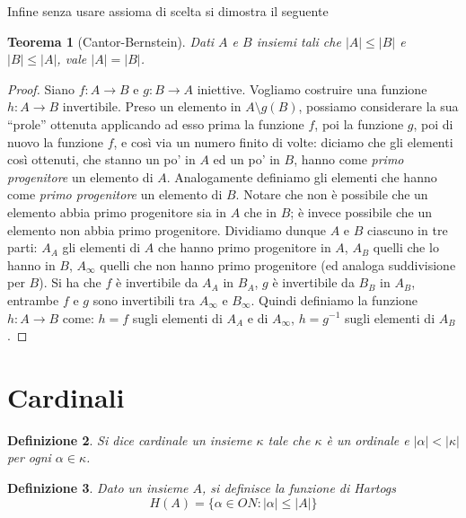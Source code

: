 \documentclass[a4paper,10pt,oneside]{article}
\newcommand{\myname}[1]{\emph{#1}}
\newcommand{\abs}[1]{\left|#1\right|}
\theoremstyle{plain}
\newtheorem{mytheorem}{Teorema}[section]
\newtheorem{mydef}[mytheorem]{Definizione}
\theoremstyle{definition}
\theoremstyle{remark}
\begin{document}
Infine senza usare assioma di scelta si dimostra il seguente

\begin{mytheorem}[Cantor-Bernstein]
 Dati $A$ e $B$ insiemi tali che $\abs A\le\abs B$ e $\abs B\le\abs A$, vale $\abs A=\abs B$.
\end{mytheorem}
\begin{proof}
 Siano $f:A\rightarrow B$ e $g:B\rightarrow A$ iniettive.
 Vogliamo costruire una funzione $h:A\rightarrow B$ invertibile.
 Preso un elemento in $A\setminus g(B)$, possiamo considerare la sua ``prole'' ottenuta applicando ad esso prima la funzione $f$, poi la funzione $g$, poi di nuovo la funzione $f$, e così via un numero finito di volte: diciamo che gli elementi così ottenuti, che stanno un po' in $A$ ed un po' in $B$, hanno come \myname{primo progenitore} un elemento di $A$. Analogamente definiamo gli elementi che hanno come \myname{primo progenitore} un elemento di $B$. Notare che non è possibile che un elemento abbia primo progenitore sia in $A$ che in $B$; è invece possibile che un elemento non abbia primo progenitore.
 Dividiamo dunque $A$ e $B$ ciascuno in tre parti: $A_A$ gli elementi di $A$ che hanno primo progenitore in $A$, $A_B$ quelli che lo hanno in $B$, $A_{\infty}$ quelli che non hanno primo progenitore (ed analoga suddivisione per $B$). 
 Si ha che $f$ è invertibile da $A_A$ in $B_A$, $g$ è invertibile da $B_B$ in $A_B$, entrambe $f$ e $g$ sono invertibili tra $A_{\infty}$ e $B_{\infty}$. Quindi definiamo la funzione $h:A\rightarrow B$ come: $h=f$ sugli elementi di $A_A$ e di $A_{\infty}$, $h=g^{-1}$ sugli elementi di $A_B$.
\end{proof}



\section{Cardinali}

\begin{mydef}
 Si dice \myname{cardinale} un insieme $\kappa$ tale che $\kappa$ è un ordinale e $\abs\alpha < \abs\kappa$ per ogni $\alpha\in\kappa$.
\end{mydef}



\begin{mydef}
 Dato un insieme $A$, si definisce la funzione di Hartogs \[H(A)=\{\alpha \in ON:\abs\alpha\le\abs A\}\]
\end{mydef}
\end{document}
